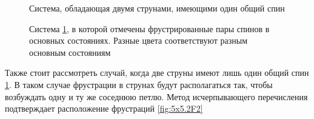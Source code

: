 \documentclass[utf8, babel, sor, jor, amsmath,amssymb, reprint]{elsarticle} %
\begin{document}
\begin{figure}[h]
	\centering
	\caption{Система, обладающая двумя струнами, имеющими один общий спин}
	\label{fig:5x5.2F}
\end{figure}
\begin{figure}[h]
	\centering
	\caption{Система \ref{fig:5x5.2F}, в которой отмечены фрустрированные пары спинов в основных состояниях. Разные цвета соответствуют разным основным состояниям}
	\label{fig:5x5.22F}
\end{figure}
Также стоит рассмотреть случай, когда две струны имеют лишь один общий спин \ref{fig:5x5.2F}.
В таком случае фрустрации в струнах будут располагаться так, чтобы возбуждать одну и ту же соседнюю петлю.
Метод исчерпывающего перечисления подтверждает расположение фрустраций \ref{fig:5x5.2F2}
\end{document}
